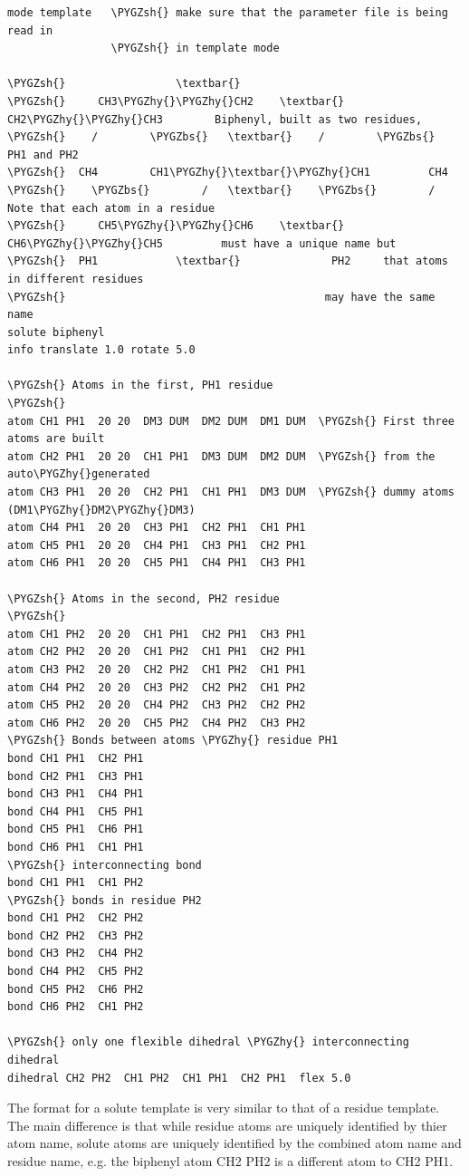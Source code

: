 \documentclass[letterpaper,10pt,english]{sphinxmanual}
\def\PYGZbs{\char`\\}
\def\PYGZsh{\char`\#}
\def\PYGZhy{\char`\-}
\begin{document}
\begin{Verbatim}[frame=single,commandchars=\\\{\}]
mode template   \PYGZsh{} make sure that the parameter file is being read in
                \PYGZsh{} in template mode

\PYGZsh{}                 \textbar{}
\PYGZsh{}     CH3\PYGZhy{}\PYGZhy{}CH2    \textbar{}     CH2\PYGZhy{}\PYGZhy{}CH3        Biphenyl, built as two residues,
\PYGZsh{}    /        \PYGZbs{}   \textbar{}    /        \PYGZbs{}             PH1 and PH2
\PYGZsh{}  CH4        CH1\PYGZhy{}\textbar{}\PYGZhy{}CH1         CH4
\PYGZsh{}    \PYGZbs{}        /   \textbar{}    \PYGZbs{}        /        Note that each atom in a residue
\PYGZsh{}     CH5\PYGZhy{}\PYGZhy{}CH6    \textbar{}     CH6\PYGZhy{}\PYGZhy{}CH5         must have a unique name but
\PYGZsh{}  PH1            \textbar{}              PH2     that atoms in different residues
\PYGZsh{}                                        may have the same name
solute biphenyl
info translate 1.0 rotate 5.0

\PYGZsh{} Atoms in the first, PH1 residue
\PYGZsh{}
atom CH1 PH1  20 20  DM3 DUM  DM2 DUM  DM1 DUM  \PYGZsh{} First three atoms are built
atom CH2 PH1  20 20  CH1 PH1  DM3 DUM  DM2 DUM  \PYGZsh{} from the auto\PYGZhy{}generated
atom CH3 PH1  20 20  CH2 PH1  CH1 PH1  DM3 DUM  \PYGZsh{} dummy atoms (DM1\PYGZhy{}DM2\PYGZhy{}DM3)
atom CH4 PH1  20 20  CH3 PH1  CH2 PH1  CH1 PH1
atom CH5 PH1  20 20  CH4 PH1  CH3 PH1  CH2 PH1
atom CH6 PH1  20 20  CH5 PH1  CH4 PH1  CH3 PH1

\PYGZsh{} Atoms in the second, PH2 residue
\PYGZsh{}
atom CH1 PH2  20 20  CH1 PH1  CH2 PH1  CH3 PH1
atom CH2 PH2  20 20  CH1 PH2  CH1 PH1  CH2 PH1
atom CH3 PH2  20 20  CH2 PH2  CH1 PH2  CH1 PH1
atom CH4 PH2  20 20  CH3 PH2  CH2 PH2  CH1 PH2
atom CH5 PH2  20 20  CH4 PH2  CH3 PH2  CH2 PH2
atom CH6 PH2  20 20  CH5 PH2  CH4 PH2  CH3 PH2
\PYGZsh{} Bonds between atoms \PYGZhy{} residue PH1
bond CH1 PH1  CH2 PH1
bond CH2 PH1  CH3 PH1
bond CH3 PH1  CH4 PH1
bond CH4 PH1  CH5 PH1
bond CH5 PH1  CH6 PH1
bond CH6 PH1  CH1 PH1
\PYGZsh{} interconnecting bond
bond CH1 PH1  CH1 PH2
\PYGZsh{} bonds in residue PH2
bond CH1 PH2  CH2 PH2
bond CH2 PH2  CH3 PH2
bond CH3 PH2  CH4 PH2
bond CH4 PH2  CH5 PH2
bond CH5 PH2  CH6 PH2
bond CH6 PH2  CH1 PH2

\PYGZsh{} only one flexible dihedral \PYGZhy{} interconnecting dihedral
dihedral CH2 PH2  CH1 PH2  CH1 PH1  CH2 PH1  flex 5.0
\end{Verbatim}

The format for a solute template is very similar to that of a residue template. The main difference is that while residue atoms are uniquely identified by thier atom name, solute atoms are uniquely identified by the combined atom name and residue name, e.g. the biphenyl atom CH2 PH2 is a different atom to CH2 PH1.
\end{document}
